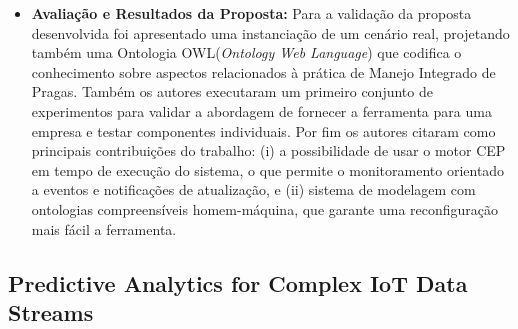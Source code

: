 \documentclass[tid,table]{texufpel} %
\begin{document}
\begin{itemize}
	
	\item \textbf{Avaliação e Resultados da Proposta:} Para a validação da proposta desenvolvida foi apresentado uma instanciação de um cenário real, projetando também uma Ontologia OWL(\textit{Ontology Web Language}) que codifica o conhecimento sobre aspectos relacionados à prática de Manejo Integrado de Pragas. Também os autores executaram um primeiro conjunto de experimentos para validar a abordagem de fornecer a ferramenta para uma empresa e testar componentes individuais. Por fim os autores citaram como principais contribuições do trabalho: (i) a possibilidade de usar o motor CEP em tempo de execução do sistema, o que permite o monitoramento orientado a eventos e notificações de atualização, e (ii) sistema de modelagem com ontologias compreensíveis homem-máquina, que garante uma reconfiguração mais fácil a ferramenta. 
	
\end{itemize}

\subsection{Predictive Analytics for Complex IoT Data Streams}
\end{document}
